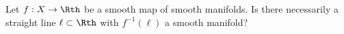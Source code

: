 Let $f:X\rightarrow \Rth$ be a smooth map of smooth manifolds. Is
there necessarily a straight line $\ell\subset \Rth$ with
$f^{-1}(\ell)$ a smooth manifold?
